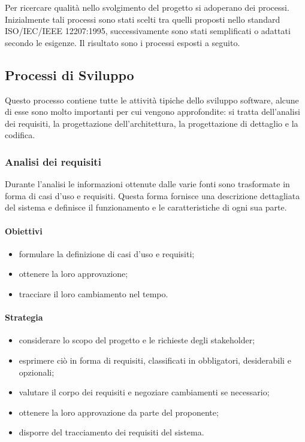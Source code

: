 Per ricercare qualità nello svolgimento del progetto si adoperano dei processi. Inizialmente tali processi sono stati scelti tra quelli proposti nello standard ISO/IEC/IEEE 12207:1995,
successivamente sono stati semplificati o adattati secondo le esigenze.
Il risultato sono i processi esposti a seguito.
\subsection{Processi di Sviluppo}
    Questo processo contiene tutte le attività tipiche dello sviluppo software, alcune di esse sono molto importanti per cui vengono approfondite: si tratta dell'analisi dei requisiti,
    la progettazione dell'architettura, la progettazione di dettaglio e la codifica.
    \subsubsection{Analisi dei requisiti}
        Durante l'analisi le informazioni ottenute dalle varie fonti sono trasformate in forma di casi d'uso e requisiti.
        Questa forma fornisce una descrizione dettagliata del sistema e definisce il funzionamento e le caratteristiche di ogni sua parte.
        \paragraph{Obiettivi}
            \begin{itemize}
                \item formulare la definizione di casi d'uso e requisiti;
                \item ottenere la loro approvazione;
                \item tracciare il loro cambiamento nel tempo.
            \end{itemize}
        \paragraph{Strategia}
            \begin{itemize}
                \item considerare lo scopo del progetto e le richieste degli stakeholder;
                \item esprimere ciò in forma di requisiti, classificati in obbligatori, desiderabili e opzionali;
                \item valutare il corpo dei requisiti e negoziare cambiamenti se necessario;
                \item ottenere la loro approvazione da parte del proponente;
                \item disporre del tracciamento dei requisiti del sistema.
            \end{itemize}
